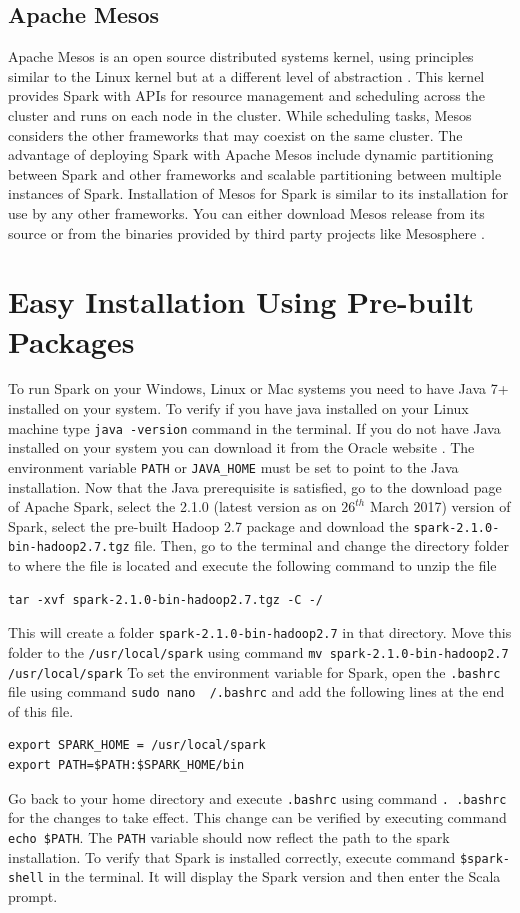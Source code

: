 \documentclass[9pt,twocolumn,twoside]{../../styles/osajnl}
\begin{document}
\subsection{Apache Mesos}
Apache Mesos is an open source distributed systems kernel, using
principles similar to the Linux kernel but at a different level of
abstraction \cite{www-spark-mesos}. This kernel provides Spark with
APIs for resource management and scheduling across the cluster and
runs on each node in the cluster. While scheduling tasks, Mesos
considers the other frameworks that may coexist on the same
cluster. The advantage of deploying Spark with Apache Mesos include
dynamic partitioning between Spark and other frameworks and scalable
partitioning between multiple instances of Spark. Installation of
Mesos for Spark is similar to its installation for use by any other
frameworks. You can either download Mesos release from its source or
from the binaries provided by third party projects like Mesosphere
\cite{www-clusters}.

\section{Easy Installation Using Pre-built Packages}
To run Spark on your Windows, Linux or Mac systems you need to have
Java 7+ installed on your system. To verify if you have java installed
on your Linux machine type \texttt{java -version} command in the
terminal.  If you do not have Java installed on your system you can
download it from the Oracle website \cite{www-oracle}. The environment
variable \texttt{PATH} or \texttt{JAVA\_}\texttt{HOME} must be set to
point to the Java installation.  Now that the Java prerequisite is
satisfied, go to the download page of Apache Spark, select the 2.1.0
(latest version as on $26^{th}$ March 2017) version of Spark, select
the pre-built Hadoop 2.7 package and download the
\texttt{spark-2.1.0-bin-hadoop2.7.tgz} file. Then, go to the terminal
and change the directory folder to where the file is located and
execute the following command to unzip the file
\begin{verbatim}
tar -xvf spark-2.1.0-bin-hadoop2.7.tgz -C -/
\end{verbatim}
This will create a folder \texttt{spark-2.1.0-bin-hadoop2.7} in that
directory. Move this folder to the \texttt{/usr/local/spark} using
command \texttt{mv spark-2.1.0-bin-hadoop2.7 /usr/local/spark} To set
the environment variable for Spark, open the \texttt{.bashrc} file
using command \texttt{sudo nano ~/.bashrc} and add the following lines
at the end of this file.
\begin{verbatim}
export SPARK_HOME = /usr/local/spark 
export PATH=$PATH:$SPARK_HOME/bin
\end{verbatim}
Go back to your home directory and execute \texttt{.bashrc} using
command \texttt{. .bashrc} for the changes to take effect. This change
can be verified by executing command \texttt{echo \$PATH}. The
\texttt{PATH} variable should now reflect the path to the spark
installation. To verify that Spark is installed correctly, execute
command \texttt{\$spark-shell} in the terminal. It will display the
Spark version and then enter the Scala prompt.
\end{document}
